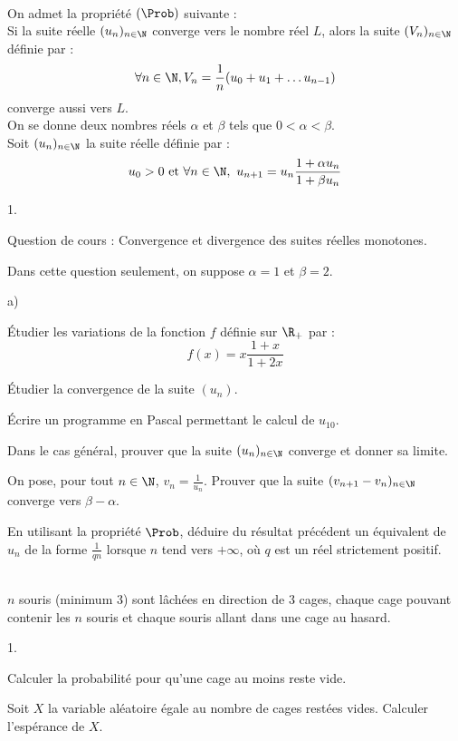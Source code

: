 \documentclass[11pt]{article}%
\begin{document}
\begin{exerciceAP}~\\
  On admet la propriété $(\Prob)$ suivante : \\
  Si la suite réelle $(u_n)_{n \in \N}$ converge vers le nombre réel
  $L$, alors la suite $(V_n)_{n \in \N}$ définie par :
  \[
  \forall n \in \N, V_n = \frac{1}{n} (u_0 + u_1 + \dots u_{n-1} )
  \]
  converge aussi vers $L$. \\
  On se donne deux nombres réels $\alpha$ et $\beta$ tels que $0 <
  \alpha < \beta$. \\
  Soit $(u_n)_{n \in \N}$ la suite réelle définie par :
  \[
  u_0 > 0 \text{ et } \forall n \in \N,\ u_{n+1} = u_n \frac{1 +
    \alpha u_n}{1 + \beta u_n}
  \]
  \begin{noliste}{1.}
    \setlength{\itemsep}{2mm}
  \item Question de cours : Convergence et divergence des suites
    réelles monotones.
  \item Dans cette question seulement, on suppose $\alpha = 1$ et
    $\beta = 2$.
    \begin{noliste}{a)}
    \setlength{\itemsep}{2mm} 
    \item Étudier les variations de la fonction $f$ définie sur
      $\R_{+}$ par :
      \[
      f(x) = x \frac{1+x}{1+2x} 
      \]
    \item Étudier la convergence de la suite $(u_n)$.
    \item Écrire un programme en Pascal permettant le calcul de $u_{10}$.
    \end{noliste}
  \item Dans le cas général, prouver que la suite $(u_n)_{n \in \N}$
    converge et donner sa limite.
  \item On pose, pour tout $n \in \N$, $v_n = \frac{1}{u_n}$. Prouver
    que la suite $(v_{n+1} - v_n)_{n \in \N}$ converge vers $\beta -
    \alpha$.
  \item En utilisant la propriété $\Prob$, déduire du résultat
    précédent un équivalent de $u_n$ de la forme $\frac{1}{q n}$
    lorsque $n$ tend vers $+\infty$, où $q$ est un réel strictement
    positif.
  \end{noliste}
\end{exerciceAP}


\begin{exerciceSP}~\\
  $n$ souris (minimum 3) sont lâchées en direction de 3 cages, chaque
  cage pouvant contenir les $n$ souris et chaque souris allant dans
  une cage au hasard. 
  \begin{noliste}{1.}
    \setlength{\itemsep}{2mm}
  \item Calculer la probabilité pour qu'une cage au moins reste vide.
  \item Soit $X$ la variable aléatoire égale au nombre de cages
    restées vides. Calculer l'espérance de $X$. 
  \end{noliste}
\end{exerciceSP}
\end{document}
